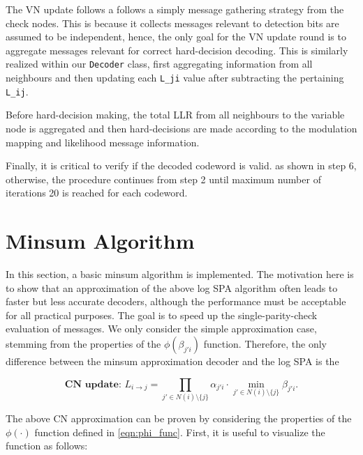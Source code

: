 \documentclass[12pt]{scrreprt}
\begin{document}
	The VN update follows a follows a simply message gathering strategy from the check nodes. This is because it collects messages relevant to detection bits are assumed to be independent, hence, the only goal for the VN update round is to aggregate messages relevant for correct hard-decision decoding. This is similarly realized within our \verb|Decoder| class, first aggregating information from all neighbours and then updating each \verb|L_ji| value after subtracting the pertaining \verb|L_ij|.
	
	Before hard-decision making, the total LLR from all neighbours to the variable node is aggregated and then hard-decisions are made according  to the modulation mapping and likelihood message information.
	
	Finally, it is critical to verify if the decoded codeword is valid. as shown in step 6, otherwise, the procedure continues from step 2 until maximum number of iterations 20 is reached for each codeword.
	
	\section{Minsum Algorithm}
	
	In this section, a basic minsum algorithm is implemented. The motivation here is to show that an approximation of the above log SPA algorithm often leads to faster but less accurate decoders, although the performance must be acceptable for all practical purposes. The goal is to speed up the single-parity-check evaluation of messages. We only consider the simple approximation case, stemming from the properties of the $\phi (\beta_{j'i})$ function. Therefore, the only difference between the minsum approximation decoder and the log SPA is the
	
	\begin{equation} \label{minsum_update} \textbf{CN update: } L_{i \to j} = \prod_{j' \in N(i) \setminus \{j\}} \alpha_{j'i} \cdot \min_{j' \in N(i) \setminus \{j\}} \beta_{j'i}. \end{equation}
	
	The above CN approximation can be proven by considering the properties of the $\phi(\cdot)$ function defined in \ref{eqn:phi_func}. First, it is useful to visualize the function as follows:
	
\end{document}
